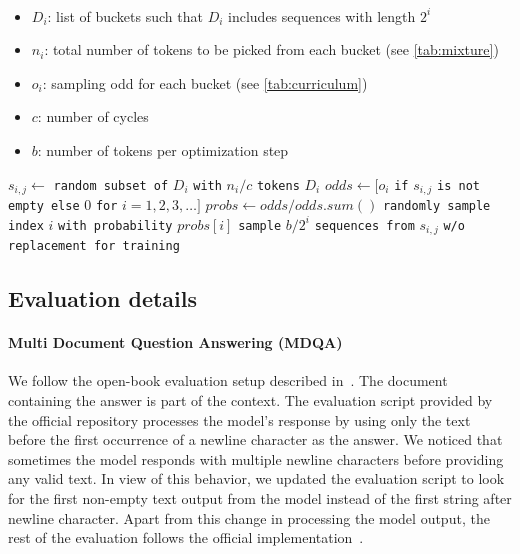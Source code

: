 \begin{algorithm}
\caption{Length based sampling and curriculum}\label{alg:sampling}
\begin{algorithmic}
\Require\\
\begin{itemize}
    \item ${D_i}$: list of buckets such that $D_i$ includes sequences with length $2^i$
    \item ${n_i}$: total number of tokens to be picked from each bucket (see \cref{tab:mixture})
    \item ${o_i}$: sampling odd for each bucket (see \cref{tab:curriculum})
    \item $c$: number of cycles
    \item $b$: number of tokens per optimization step
\end{itemize}

\State $s_{i,j} \gets$ \texttt{random subset of} $D_i$ \texttt{with} $n_i/c$ \texttt{tokens}  $D_i$
\State $odds \gets [o_i$ \texttt{if} $s_{i,j}$ \texttt{is not empty else} 0 \texttt{for} $i=1,2,3,\ldots]$
\State $probs \gets odds / odds.sum()$
\State \texttt{randomly sample index} $i$ \texttt{with probability} $probs[i]$
\State \texttt{sample} $b/2^i$ \texttt{sequences from} $s_{i,j}$ \texttt{w/o replacement for training}
\EndWhile
\EndFor
\end{algorithmic}
\end{algorithm}

\subsection{Evaluation details}\label{sec:eval_detail}
\paragraph{Multi Document Question Answering (MDQA)} 
We follow the open-book evaluation setup described in~\cite{liu2024lost}. The document containing the answer is part of the context. The evaluation script provided by the official repository processes the model's response by using only the text before the first occurrence of a newline character as the answer. We noticed that sometimes the model responds with multiple newline characters before providing any valid text. In view of this behavior, we updated the evaluation script to look for the first non-empty text output from the model instead of the first string after newline character. Apart from this change in processing the model output, the rest of the evaluation follows the official implementation~\cite{liu2024lost}.

